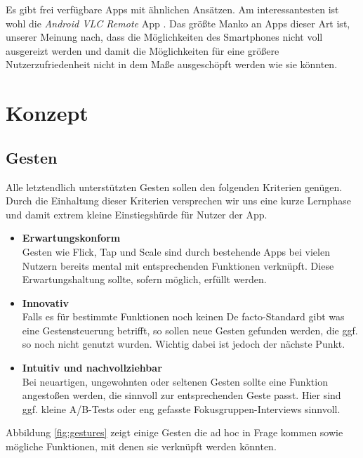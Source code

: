 \documentclass[a4paper,12pt]{article}
\begin{document}
Es gibt frei verfügbare Apps mit ähnlichen Ansätzen. Am interessantesten ist wohl die \textit{Android VLC Remote} App \cite{android-vlc-remote}. Das größte Manko an Apps dieser Art ist, unserer Meinung nach, dass die Möglichkeiten des Smartphones nicht voll ausgereizt werden und damit die Möglichkeiten für eine größere Nutzerzufriedenheit nicht in dem Maße ausgeschöpft werden wie sie könnten.

\newpage
\section{Konzept}

\subsection{Gesten}
Alle letztendlich unterstützten Gesten sollen den folgenden Kriterien genügen. Durch die Einhaltung dieser Kriterien versprechen wir uns eine kurze Lernphase und damit extrem kleine Einstiegshürde für Nutzer der App.

\begin{itemize}
	\item \textbf{Erwartungskonform} \\
		Gesten wie Flick, Tap und Scale sind durch bestehende Apps bei vielen Nutzern bereits mental mit entsprechenden Funktionen verknüpft. Diese Erwartungshaltung sollte, sofern möglich, erfüllt werden.
	\item \textbf{Innovativ} \\
		Falls es für bestimmte Funktionen noch keinen De facto-Standard gibt was eine Gestensteuerung betrifft, so sollen neue Gesten gefunden werden, die ggf. so noch nicht genutzt wurden. Wichtig dabei ist jedoch der nächste Punkt.
	\item \textbf{Intuitiv und nachvollziehbar} \\
		Bei neuartigen, ungewohnten oder seltenen Gesten sollte eine Funktion angestoßen werden, die sinnvoll zur entsprechenden Geste passt. Hier sind ggf. kleine A/B-Tests oder eng gefasste Fokusgruppen-Interviews sinnvoll.
\end{itemize}

Abbildung \ref{fig:gestures} zeigt einige Gesten die ad hoc in Frage kommen sowie mögliche Funktionen, mit denen sie verknüpft werden könnten.
\end{document}
